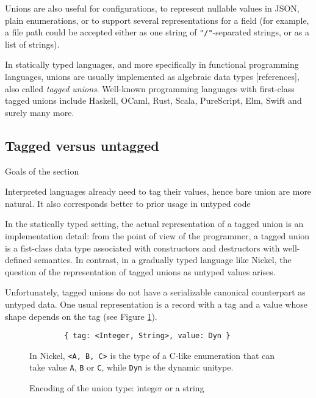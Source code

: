 \documentclass{article}
\begin{document}
Unions are also useful for configurations, to represent nullable values in JSON,
plain enumerations, or to support several representations for a field (for
example, a file path could be accepted either as one string of
\lstinline+"/"+-separated strings, or as a list of strings).

In statically typed languages, and more specifically in functional programming
languages, unions are usually implemented as algebraic data types [references],
also called \emph{tagged unions}. Well-known programming languages with
first-class tagged unions include Haskell, OCaml, Rust, Scala, PureScript, Elm,
Swift and surely many more.

\subsection{Tagged versus untagged}
\color{red}Goals of the section

Interpreted languages already need to tag their values, hence bare union are more natural.
It also corresponds better to prior usage in untyped code\vspace{0.5cm}\color{black}

In the statically typed setting, the actual representation of a tagged union is
an implementation detail: from the point of view of the programmer, a tagged
union is a fist-class data type associated with constructors and destructors
with well-defined semantics. In contrast, in a gradually typed language like
Nickel, the question of the representation of tagged unions as untyped values
arises.

Unfortunately, tagged unions do not have a serializable canonical counterpart as
untyped data. One usual representation is a record with a tag and a value whose
shape depends on the tag (see Figure \ref{fig:union-encoding}).

\begin{figure}
  \begin{center}
    \begin{lstlisting}
        { tag: <Integer, String>, value: Dyn }
    \end{lstlisting}
  \end{center}
\caption{Encoding of the union type: integer or a string}
\label{fig:union-encoding}
\medskip
\small
In Nickel, \lstinline+<A, B, C>+ is the type of a C-like enumeration that can
take value \lstinline+A+, \lstinline+B+ or \lstinline+C+, while \lstinline+Dyn+
is the dynamic unitype.
\end{figure}
\end{document}
